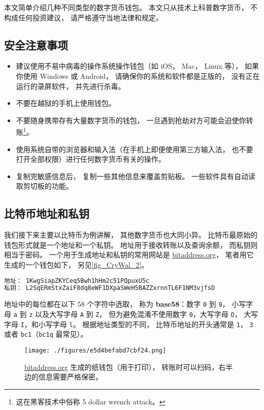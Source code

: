 
本文简单介绍几种不同类型的数字货币钱包。 本文只从技术上科普数字货币， 不构成任何投资建议， 请严格遵守当地法律和规定。

\subsection{安全注意事项}
\begin{itemize}
\item 建议使用不易中病毒的操作系统操作钱包（如 iOS， Mac， Linux 等）， 如果你使用 Windows 或 Android， 请确保你的系统和软件都是正版的， 没有正在运行的录屏软件， 并先进行杀毒。
\item 不要在越狱的手机上使用钱包。
\item 不要随身携带存有大量数字货币的钱包， 一旦遇到抢劫对方可能会迫使你转账\footnote{这在黑客技术中俗称 5 dollar wrench attack。}。
\item 使用系统自带的浏览器和输入法（在手机上即便使用第三方输入法， 也不要打开全部权限）进行任何数字货币有关的操作。
\item 复制完敏感信息后， 复制一些其他信息来覆盖剪贴板。 一些软件具有自动读取剪切板的功能。
\end{itemize}

\subsection{比特币地址和私钥}
我们接下来主要以比特币为例讲解， 其他数字货币也大同小异。 比特币最原始的钱包形式就是一个地址和一个私钥。 地址用于接收转账以及查询余额， 而私钥则相当于密码。 一个用于生成地址和私钥的常用网站是 \href{https://www.bitaddress.org/}{bitaddress.org}， 笔者用它生成的一个钱包如下， 另见\autoref{fig_CryWal_2}。
\begin{lstlisting}[language=bash]
地址： 1KwgSiapZKYCeq5Bwh1hHm2c51PQpuxU5c
私钥： L2SqERmStxZaiF8dq8eWF1DXpaSWeH5BAZZxrnnTL6F1NM3vjfsD
\end{lstlisting}

地址中的每位都在以下 58 个字符中选取， 称为 \textbf{base58}：数字 \verb|0| 到 \verb|9|， 小写字母 \verb|a| 到 \verb|z| 以及大写字母 \verb|A| 到 \verb|Z|， 但为避免混淆不使用数字 \verb|0|，大写字母 \verb|O|， 大写字母 \verb|I|，和小写字母 \verb|l|。 根据地址类型的不同， 比特币地址的开头通常是 \verb|1|， \verb|3| 或者 \verb|bc1|（\verb|bc1q| 最常见）。

\begin{figure}[ht]
\centering
\texttt{[image: ./figures/e5d4befabd7cbf24.png]}
\caption{\href{https://www.bitaddress.org/}{bitaddress.org} 生成的纸钱包（用于打印）， 转账时可以扫码，右半边的信息需要严格保密。} \label{fig_CryWal_2}
\end{figure}

